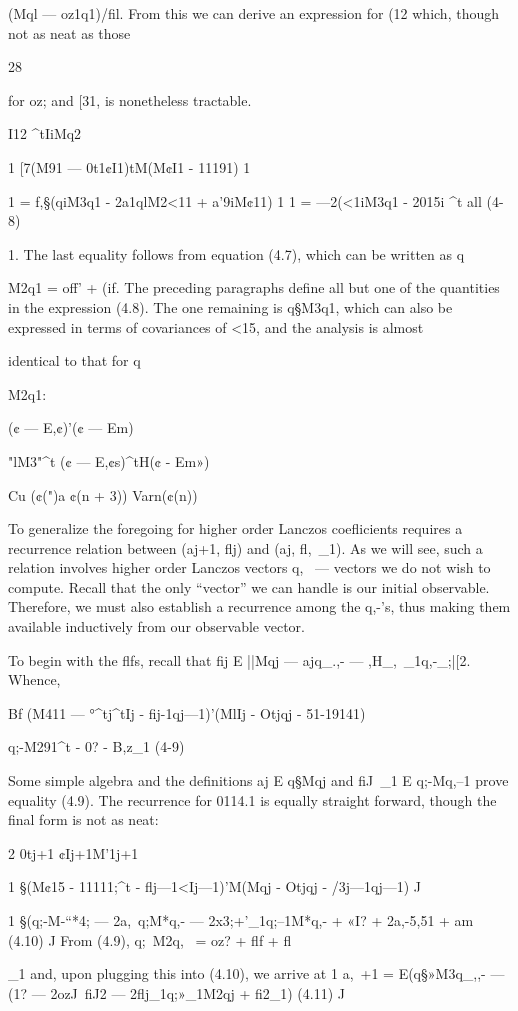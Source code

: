 (Mql — oz1q1)/fil. From this we can derive an expression for (12 which, though not as neat as those

28

for oz; and [31, is nonetheless tractable.

I12 ^tIiMq2

1
[7(M91 — 0t1¢I1)tM(M¢I1 - 11191)
1

1
= f,§(qiM3q1 - 2a1qlM2<11 + a’9iM¢11)
1
1
= —2(<1iM3q1 - 2015i ^t all (4-8)

1.
The last equality follows from equation (4.7), which can be written as q{M2q1 = off’ + (if. The
preceding paragraphs define all but one of the quantities in the expression (4.8). The one remaining
is q§M3q1, which can also be expressed in terms of covariances of <15, and the analysis is almost

identical to that for q{M2q1:

(¢ — E,¢)'(¢ — Em)

"lM3"^t (¢ — E,¢s)^tH(¢ - Em»)

Cu (¢(")a ¢(n + 3))
Varn(¢(n))

To generalize the foregoing for higher order Lanczos coeﬂicients requires a recurrence
relation between (aj+1, ﬂj) and (aj, ﬂ,~_1). As we will see, such a relation involves higher order
Lanczos vectors q,~ — vectors we do not wish to compute. Recall that the only “vector” we can
handle is our initial observable. Therefore, we must also establish a recurrence among the q,-’s, thus
making them available inductively from our observable vector.

To begin with the ﬂfs, recall that fij E ||Mqj — ajq_.,- — ,H_,~_1q,-_;|[2. Whence,

Bf (M411 — °^tj^tIj - fij-1qj—1)’(MlIj - Otjqj - 51-19141)

q;-M291^t - 0? - B,z_1 (4-9)

Some simple algebra and the definitions aj E q§Mqj and fiJ~_1 E q;-Mq,--1 prove equality (4.9). The
recurrence for 0114.1 is equally straight forward, though the final form is not as neat:

2
0tj+1 ¢Ij+1M'1j+1

1
§(M¢15 - 11111;^t - ﬂj—1<Ij—1)'M(Mqj - Otjqj - /3j—1qj—1)
J

1
§(q;-M-“*4; — 2a,~q;M*q,- — 2x3;+’_1q;--1M*q,- + «I? + 2a,-5,51 + am (4.10)
J
From (4.9), q;~M2q,~ = oz? + ﬂf + ﬂ}_1 and, upon plugging this into (4.10), we arrive at
1
a,~+1 = E(q§»M3q_,,- — (1? — 2ozJ~fiJ2 — 2ﬂj_1q;»_1M2qj + fi2_1) (4.11)
J

}
